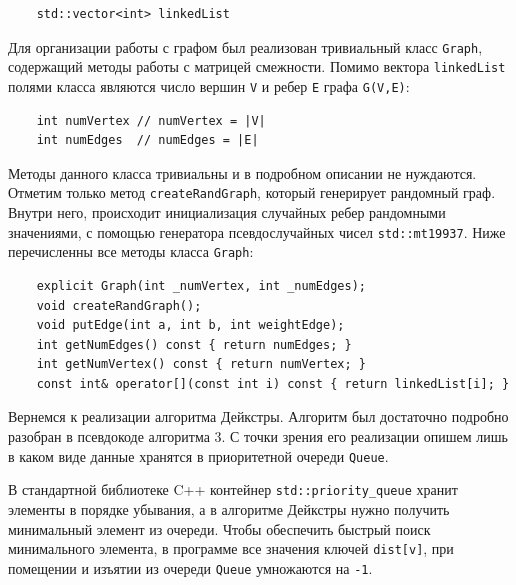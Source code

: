 \documentclass{article}
\begin{document}
\vspace{10pt}
\begin{lstlisting}
    std::vector<int> linkedList
\end{lstlisting}
\vspace{-25pt}

\par Для организации работы с графом был реализован тривиальный класс \verb|Graph|, содержащий методы работы с матрицей смежности. Помимо вектора \verb|linkedList| полями класса являются число вершин \verb|V| и ребер \verb|E| графа \verb|G(V,E)|: 

\vspace{10pt}
\begin{lstlisting}
    int numVertex // numVertex = |V|
    int numEdges  // numEdges = |E|
\end{lstlisting}
\vspace{-25pt}

\par Методы данного класса тривиальны и в подробном описании не нуждаются. Отметим только метод \verb|createRandGraph|, который генерирует рандомный граф. Внутри него, происходит инициализация случайных ребер рандомными значениями, с помощью генератора псевдослучайных чисел \verb|std::mt19937|. Ниже перечисленны все методы класса \verb|Graph|:

\vspace{10pt} 
\begin{lstlisting}
    explicit Graph(int _numVertex, int _numEdges);
    void createRandGraph();
    void putEdge(int a, int b, int weightEdge);
    int getNumEdges() const { return numEdges; }
    int getNumVertex() const { return numVertex; }
    const int& operator[](const int i) const { return linkedList[i]; }
\end{lstlisting}
\vspace{-25pt}

\par Вернемся к реализации алгоритма Дейкстры. Алгоритм был достаточно подробно разобран в псевдокоде алгоритма 3. С точки зрения его реализации опишем лишь в каком виде данные хранятся в приоритетной очереди \verb|Queue|.

\par В стандартной библиотеке C++ контейнер \verb|std::priority_queue| хранит элементы в порядке убывания, а в алгоритме Дейкстры нужно получить минимальный элемент из очереди. Чтобы обеспечить быстрый поиск минимального элемента, в программе все значения ключей \verb|dist[v]|, при помещении и изъятии из очереди \verb|Queue| умножаются на \verb|-1|. 
\end{document}
